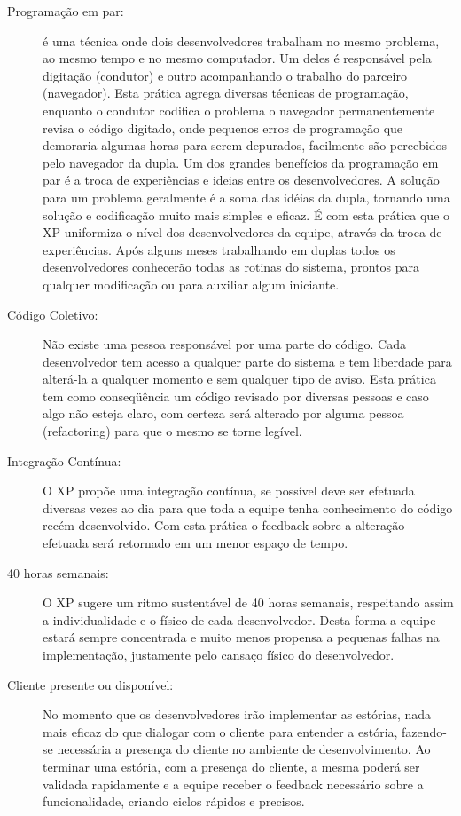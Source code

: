 \begin{description}
  \item [Programação em par:] é uma técnica onde dois desenvolvedores trabalham no mesmo problema, ao mesmo tempo e no mesmo computador. Um deles é responsável pela digitação (condutor) e outro acompanhando o trabalho do parceiro (navegador). Esta prática agrega diversas técnicas de programação, enquanto o condutor codifica o problema o navegador permanentemente revisa o código digitado, onde pequenos erros de programação que demoraria algumas horas para serem depurados, facilmente são percebidos pelo navegador da dupla. Um dos grandes benefícios da programação em par é a troca de experiências e ideias entre os desenvolvedores. A solução para um problema geralmente é a soma das idéias da dupla, tornando uma solução e codificação muito mais simples e eficaz. É com esta prática que o XP uniformiza o nível dos desenvolvedores da equipe, através da troca de experiências. Após alguns meses trabalhando em duplas todos os desenvolvedores conhecerão todas as rotinas do sistema, prontos para qualquer modificação ou para auxiliar algum iniciante.

  \item [Código Coletivo:] Não existe uma pessoa responsável por uma parte do código. Cada desenvolvedor tem acesso a qualquer parte do sistema e tem liberdade para alterá-la a qualquer momento e sem qualquer tipo de aviso. Esta prática tem como conseqüência um código revisado por diversas pessoas e caso algo não esteja claro, com certeza será alterado por alguma pessoa (refactoring) para que o mesmo se torne legível.

  \item [Integração Contínua:] O XP propõe uma integração contínua, se possível deve ser efetuada diversas vezes ao dia para que toda a equipe tenha conhecimento do código recém desenvolvido. Com esta prática o feedback sobre a alteração efetuada será retornado em um menor espaço de tempo.

  \item [40 horas semanais:] O XP sugere um ritmo sustentável de 40 horas semanais, respeitando assim a individualidade e o físico de cada desenvolvedor. Desta forma a equipe estará sempre concentrada e muito menos propensa a pequenas falhas na implementação, justamente pelo cansaço físico do desenvolvedor.

  \item [Cliente presente ou disponível:] No momento que os desenvolvedores irão implementar as estórias, nada mais eficaz do que dialogar com o cliente para entender a estória, fazendo-se necessária a presença do cliente no ambiente de desenvolvimento. Ao terminar uma estória, com a presença do cliente, a mesma poderá ser validada rapidamente e a equipe receber o feedback necessário sobre a funcionalidade, criando ciclos rápidos e precisos.


\end{description}

